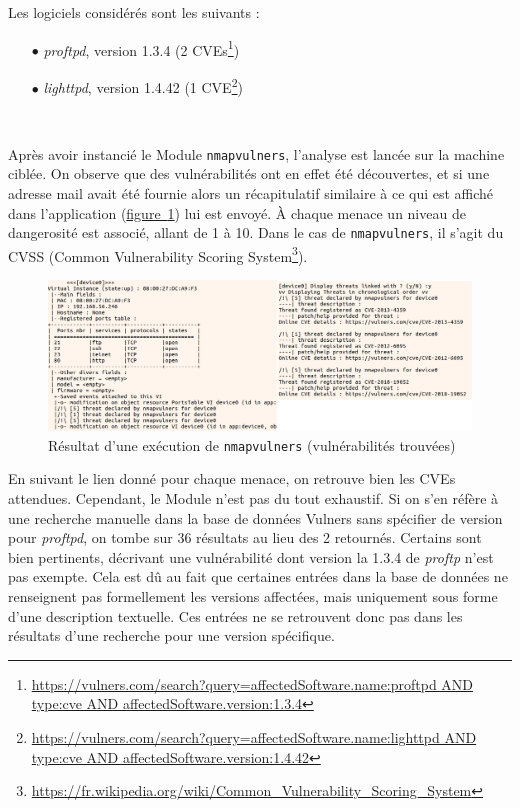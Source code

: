 \documentclass[]{article}
\newcommand{\wordlink}[2]{\hyperref[#1]{#2~\ref{#1}}}
\begin{document}
Les logiciels considérés sont les suivants :

\begin{itemize}
\item[$\bullet$] \textit{proftpd}, version 1.3.4 (2 CVEs\footnote{\url{https://vulners.com/search?query=affectedSoftware.name:proftpd AND type:cve AND affectedSoftware.version:1.3.4}})
\item[$\bullet$] \textit{lighttpd}, version 1.4.42 (1 CVE\footnote{\url{https://vulners.com/search?query=affectedSoftware.name:lighttpd AND type:cve AND affectedSoftware.version:1.4.42}})
\end{itemize}
~\\

\par Après avoir instancié le Module \texttt{nmapvulners}, l'analyse est lancée sur la machine ciblée. On observe que des vulnérabilités ont en effet été découvertes, et si une adresse mail avait été fournie alors un récapitulatif similaire à ce qui est affiché dans l'application (\wordlink{threatsvm}{figure}) lui est envoyé. À chaque menace un niveau de dangerosité est associé, allant de 1 à 10. Dans le cas de \texttt{nmapvulners}, il s'agit du CVSS (Common Vulnerability Scoring System\footnote{\url{https://fr.wikipedia.org/wiki/Common_Vulnerability_Scoring_System}}).

\vspace{0.1cm}

\begin{figure}[!ht]
\centering
     \includegraphics[width=1.05\linewidth]{threatsVM}
     \caption{Résultat d'une exécution de \texttt{nmapvulners} (vulnérabilités trouvées)}
     \label{threatsvm}
\end{figure}

\newpage

En suivant le lien donné pour chaque menace, on retrouve bien les CVEs attendues. Cependant, le Module n'est pas du tout exhaustif. Si on s'en réfère à une recherche manuelle dans la base de données Vulners sans spécifier de version pour \textit{proftpd}, on tombe sur 36 résultats au lieu des 2 retournés. Certains sont bien pertinents, décrivant une vulnérabilité dont version la 1.3.4 de \textit{proftp} n'est pas exempte. Cela est dû au fait que certaines entrées dans la base de données ne renseignent pas formellement les versions affectées, mais uniquement sous forme d'une description textuelle. Ces entrées ne se retrouvent donc pas dans les résultats d'une recherche pour une version spécifique.\\
\end{document}
